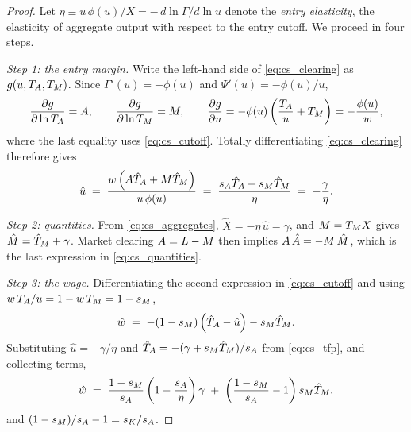 \begin{proof}
Let $\eta \equiv u\,\phi(u)/X = -\,d\ln\Gamma/d\ln u$ denote the \emph{entry elasticity}, the elasticity of aggregate output with respect to the entry cutoff.
We proceed in four steps.

\emph{Step 1: the entry margin.}
Write the left-hand side of \eqref{eq:cs_clearing} as $g(u, T_{A}, T_{M})$.
Since $\Gamma'(u) = -\phi(u)$ and $\Psi'(u) = -\phi(u)/u$,
\[
\frac{\partial g}{\partial \ln T_{A}} = A,
\qquad
\frac{\partial g}{\partial \ln T_{M}} = M,
\qquad
\frac{\partial g}{\partial u} = -\phi(u)\left(\frac{T_{A}}{u} + T_{M}\right) = -\frac{\phi(u)}{w},
\]
where the last equality uses \eqref{eq:cs_cutoff}.
Totally differentiating \eqref{eq:cs_clearing} therefore gives
\begin{equation}
\hat{u} \;=\; \frac{w\left(A \hat{T}_{A} + M \hat{T}_{M}\right)}{u\,\phi(u)} \;=\; \frac{s_{A}\hat{T}_{A} + s_{M}\hat{T}_{M}}{\eta} \;=\; -\frac{\gamma}{\eta}.
\label{eq:cs_proof_cutoff}
\end{equation}

\emph{Step 2: quantities.}
From \eqref{eq:cs_aggregates}, $\hat{X} = -\eta\,\hat{u} = \gamma$, and $M = T_{M}X$ gives $\hat{M} = \hat{T}_{M} + \gamma$.
Market clearing $A = L - M$ then implies $A\,\hat{A} = -M\,\hat{M}$, which is the last expression in \eqref{eq:cs_quantities}.

\emph{Step 3: the wage.}
Differentiating the second expression in \eqref{eq:cs_cutoff} and using $w\,T_{A}/u = 1 - w\,T_{M} = 1 - s_{M}$,
\[
\hat{w} \;=\; -(1-s_{M})\left(\hat{T}_{A} - \hat{u}\right) - s_{M}\hat{T}_{M}.
\]
Substituting $\hat{u} = -\gamma/\eta$ and $\hat{T}_{A} = -(\gamma + s_{M}\hat{T}_{M})/s_{A}$ from \eqref{eq:cs_tfp}, and collecting terms,
\[
\hat{w} \;=\; \frac{1-s_{M}}{s_{A}}\left(1 - \frac{s_{A}}{\eta}\right)\gamma \;+\; \left(\frac{1-s_{M}}{s_{A}} - 1\right)s_{M}\hat{T}_{M},
\]
and $(1-s_{M})/s_{A} - 1 = s_{K}/s_{A}$.


\end{proof}
